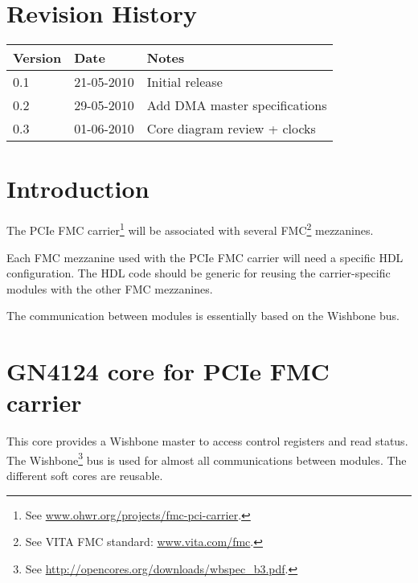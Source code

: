 \documentclass[10pt,a4paper]{cerndoc}
\begin{document}
  \cerntitle
  \section*{Revision History}
  \begin{tabularx}{\textwidth}{|p{3cm}|p{3cm}|X|}
    \hline \textbf{Version}&\textbf{Date}&\textbf{Notes}\\ \hline \hline
    0.1 & 21-05-2010 & Initial release\\ \hline
    0.2 & 29-05-2010 & Add DMA master specifications\\ \hline
    0.3 & 01-06-2010 & Core diagram review + clocks\\ \hline

  \end{tabularx}

  \tableofcontents
  \listoffigures
  \clearpage


  \section{Introduction}
The PCIe FMC carrier\footnote{See \href{http://www.ohwr.org/projects/fmc-pci-carrier}{www.ohwr.org/projects/fmc-pci-carrier}.} will be associated with several FMC\footnote{See VITA FMC standard: \href{http://www.vita.com/fmc}{www.vita.com/fmc}.} mezzanines. 

Each FMC mezzanine used with the PCIe FMC carrier will need a specific HDL configuration. The HDL code should be generic for reusing the carrier-specific modules with the other FMC mezzanines. 

 The communication between modules is essentially based on the Wishbone bus.




  \section{GN4124 core for PCIe FMC carrier}
  This core provides a Wishbone master to access control registers and read status.  The Wishbone\footnote{See \href{http://opencores.org/downloads/wbspec\_b3.pdf}{http://opencores.org/downloads/wbspec\_b3.pdf}.} bus is used for almost all communications between modules. The different soft cores are reusable.
  
\end{document}
